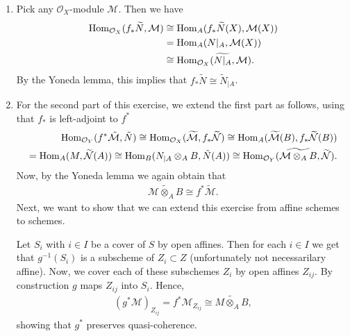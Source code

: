 \newcommand{\sheet}{7}




\maketitle{}

\begin{exercise}{1}
    \begin{enumerate}
        \item
        Pick any $\mathcal{O}_X$-module $\mathcal{M}$. Then we have
        \begin{align*}
            \operatorname{Hom}_{\mathcal{O}_X} (f_* \widetilde{N}, \mathcal{M}) &\cong
            \operatorname{Hom}_A(f_* \widetilde{N}(X), \mathcal{M}(X)) \\
            &= \operatorname{Hom}_A(N|_A, \mathcal{M}(X)) \\
            &\cong \operatorname{Hom}_{\mathcal{O}_X}(\widetilde{N|_A}, \mathcal{M}).
        \end{align*}
        By the Yoneda lemma, this implies that $f_*\widetilde{N}\cong
    \tilde{N}_{|A}$. 
    \item For the second part of this exercise, we extend the
        first part as follows, using that $f_*$ is left-adjoint to $f^*$
        \begin{align*}
            \operatorname{Hom}_{\mathcal{O}_Y}(f^*\tilde{\mathcal{M}},\tilde{N})
            \cong \operatorname{Hom}_{\mathcal{O}_X}(\widetilde{\mathcal{M}},f_*\widetilde{\mathcal{N}})
            \cong \operatorname{Hom}_A (\widetilde{\mathcal{M}}(B),f_*\widetilde{\mathcal{N}}(B))\\
            = \operatorname{Hom}_A(M,\widetilde{\mathcal{N}}(A))
            \cong \operatorname{Hom}_B(N_{|A}\otimes_A B, \tilde{N}(A))
            \cong \operatorname{Hom}_{\mathcal{O}_Y}(\widetilde{\mathcal{M}\otimes_A B}, \widetilde{\mathcal{N}}).
        \end{align*} 
        Now, by the Yoneda lemma we again obtain that 
        \begin{align*}
            \widetilde{\mathcal{M}\otimes_A B} 
            \cong f^*\tilde{\mathcal{M}}.
        \end{align*}
        Next, we want to show that we can extend this exercise from affine schemes to schemes.
        
        Let $S_i$ with $i\in I$ be a cover of $S$ by open affines. Then for each $i\in I$ we get that
        $g^{-1}(S_i)$ is a subscheme of $Z_i\subset Z$ (unfortunately not necessarilary affine). Now, we cover
        each of these subschemes $Z_i$ by open affines $Z_{ij}$. By construction $g$ maps $Z_{ij}$ into $S_i$.
        Hence, 
        \begin{align*}
            (g^*\mathcal{M})_{Z_{ij}}=f^*\mathcal{M}_{Z_{ij}}\cong \widetilde{M\otimes_A B},
        \end{align*}
        showing that $g^*$ preserves quasi-coherence.
    \end{enumerate}
\end{exercise}

